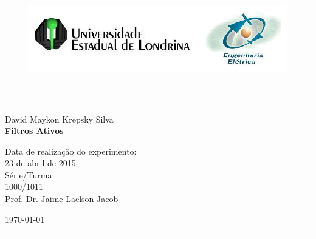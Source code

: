 \begin{titlepage}
\begin{center}
\begin{figure}[h]
\includegraphics[scale=0.76]{Imagens/topdotitulo.png}
\end{figure}
\rule{\columnwidth}{1.5mm}
\

\large David Maykon Krepsky Silva\\

\vspace{4cm}
{\bf \Large Filtros Ativos}
\vspace{3.5cm}

\begin{flushright}
Data de realização do experimento:\\
23 de abril de 2015\\
Série/Turma:\\
1000/1011\\
Prof. Dr. Jaime Laelson Jacob 
\end{flushright}

\vspace{3.2cm}
\today

\rule{\columnwidth}{1.3mm}
\end{center}
\end{titlepage}
\blankpage